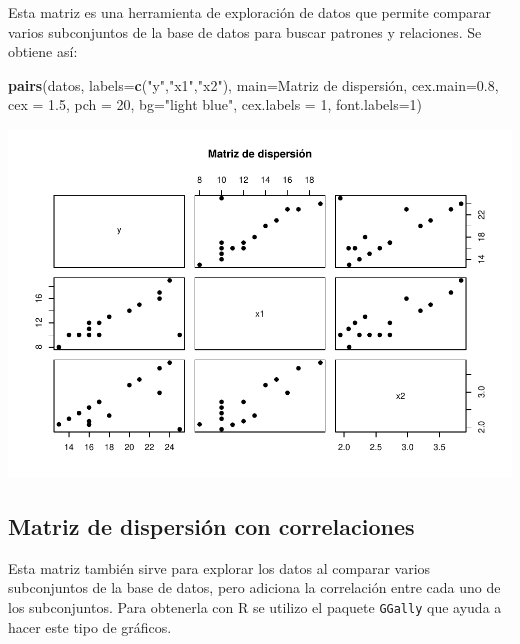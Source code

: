 \documentclass[
]{book}
\newenvironment{Shaded}{\begin{snugshade}}{\end{snugshade}}
\newcommand{\AttributeTok}[1]{\textcolor[rgb]{0.13,0.29,0.53}{#1}}
\newcommand{\DecValTok}[1]{\textcolor[rgb]{0.00,0.00,0.81}{#1}}
\newcommand{\FloatTok}[1]{\textcolor[rgb]{0.00,0.00,0.81}{#1}}
\newcommand{\FunctionTok}[1]{\textcolor[rgb]{0.13,0.29,0.53}{\textbf{#1}}}
\newcommand{\NormalTok}[1]{#1}
\newcommand{\StringTok}[1]{\textcolor[rgb]{0.31,0.60,0.02}{#1}}
\begin{document}
Esta matriz es una herramienta de exploración de datos que permite comparar varios subconjuntos de la base de datos para buscar patrones y relaciones. Se obtiene así:

\begin{Shaded}
\begin{Highlighting}[]
\FunctionTok{pairs}\NormalTok{(datos, }\AttributeTok{labels=}\FunctionTok{c}\NormalTok{(}\StringTok{"y"}\NormalTok{,}\StringTok{"x1"}\NormalTok{,}\StringTok{"x2"}\NormalTok{), }\AttributeTok{main=}\StringTok{\textquotesingle{}Matriz de dispersión\textquotesingle{}}\NormalTok{, }\AttributeTok{cex.main=}\FloatTok{0.8}\NormalTok{, }\AttributeTok{cex =} \FloatTok{1.5}\NormalTok{, }\AttributeTok{pch =} \DecValTok{20}\NormalTok{, }\AttributeTok{bg=}\StringTok{"light blue"}\NormalTok{, }\AttributeTok{cex.labels =} \DecValTok{1}\NormalTok{, }\AttributeTok{font.labels=}\DecValTok{1}\NormalTok{)}
\end{Highlighting}
\end{Shaded}

\includegraphics{_main_files/figure-latex/mtdisp-1.pdf}

\hypertarget{matriz-de-dispersiuxf3n-con-correlaciones}{%
\subsection{Matriz de dispersión con correlaciones}\label{matriz-de-dispersiuxf3n-con-correlaciones}}

Esta matriz también sirve para explorar los datos al comparar varios subconjuntos de la base de datos, pero adiciona la correlación entre cada uno de los subconjuntos. Para obtenerla con R se utilizo el paquete \texttt{GGally} que ayuda a hacer este tipo de gráficos.
\end{document}
